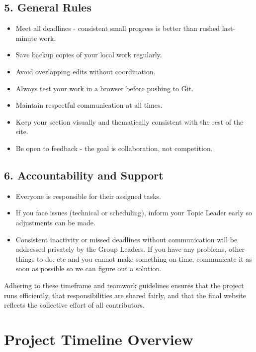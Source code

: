 \documentclass[a4paper,12pt]{article}
\begin{document}
\begin{itemize}[leftmargin=1.2cm]
\subsection*{5. General Rules}
\begin{itemize}[leftmargin=1.2cm]
    \item Meet all deadlines - consistent small progress is better than rushed last-minute work.
    \item Save backup copies of your local work regularly.
    \item Avoid overlapping edits without coordination.
    \item Always test your work in a browser before pushing to Git.
    \item Maintain respectful communication at all times.
    \item Keep your section visually and thematically consistent with the rest of the site.
    \item Be open to feedback - the goal is collaboration, not competition.
\end{itemize}

\vspace{0.3cm}
\subsection*{6. Accountability and Support}
\begin{itemize}[leftmargin=1.2cm]
    \item Everyone is responsible for their assigned tasks.
    \item If you face issues (technical or scheduling), inform your Topic Leader early so adjustments can be made.
    \item Consistent inactivity or missed deadlines without communication will be addressed privately by the Group Leaders. If you have any problems, other things to do, etc and you cannot make something on time, communicate it as soon as possible so we can figure out a solution.
\end{itemize}

\vspace{0.5cm}
\noindent
Adhering to these timeframe and teamwork guidelines ensures that the project runs efficiently, that responsibilities are shared fairly, and that the final website reflects the collective effort of all contributors.


\newpage
\section*{Project Timeline Overview}


\end{itemize}
\end{document}
